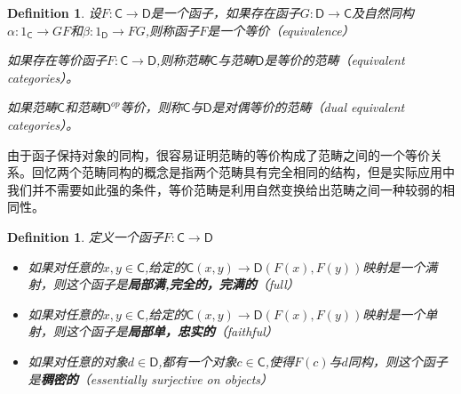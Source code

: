 \documentclass{article}
\newtheorem{definition}[theorem]{Definition}
\newcommand{\tbf}{\textbf}
\newcommand*{\cat}[1]{\textsf{#1}\xspace}
\newcommand{\al}{\alpha}
\newcommand{\be}{\beta}
\newcommand*{\xfunc}[4]{{#2}\colon{#3}{#1}{#4}}
\newcommand*{\func}[3]{\xfunc{\to}{#1}{#2}{#3}}
\begin{document}
\begin{definition}
\rm 设$\func{F}{\cat{C}}{\cat{D}}$是一个函子，如果存在函子$\func{G}{\cat{D}}{\cat{C}}$及自然同构$\func{\al}{1_{\cat{C}}}{GF}$和$\func{\be}{1_{\cat{D}}}{FG}$,则称函子$F$是一个等价（equivalence）

\begin{center}
\end{center}


如果存在等价函子$\func{F}{\cat{C}}{\cat{D}}$,则称范畴$\cat{C}$与范畴$\cat{D}$是等价的范畴（equivalent categories）。

如果范畴$\cat{C}$和范畴$\cat{D}^{op}$等价，则称$\cat{C}$与$\cat{D}$是对偶等价的范畴（dual equivalent categories）。
\end{definition}

由于函子保持对象的同构，很容易证明范畴的等价构成了范畴之间的一个等价关系。回忆两个范畴同构的概念是指两个范畴具有完全相同的结构，但是实际应用中我们并不需要如此强的条件，等价范畴是利用自然变换给出范畴之间一种较弱的相同性。

\begin{definition}
\rm 定义一个函子$\func{F}{\cat{C}}{\cat{D}}$
	\begin{itemize}
		\item 如果对任意的$x,y \in \cat{C}$,给定的$\cat{C}(x,y) \rightarrow \cat{D}(F(x),F(y))$映射是一个满射，则这个函子是\tbf{局部满,完全的，完满的}（full）
		\item 如果对任意的$x,y \in \cat{C}$,给定的$\cat{C}(x,y) \rightarrow \cat{D}(F(x),F(y))$映射是一个单射，则这个函子是\tbf{局部单，忠实的}（faithful）
		\item 如果对任意的对象$d \in \cat{D}$,都有一个对象$c \in \cat{C}$,使得$F(c)$与$d$同构，则这个函子是\tbf{稠密的}（essentially surjective on objects）
	\end{itemize}
\end{definition}
\end{document}
